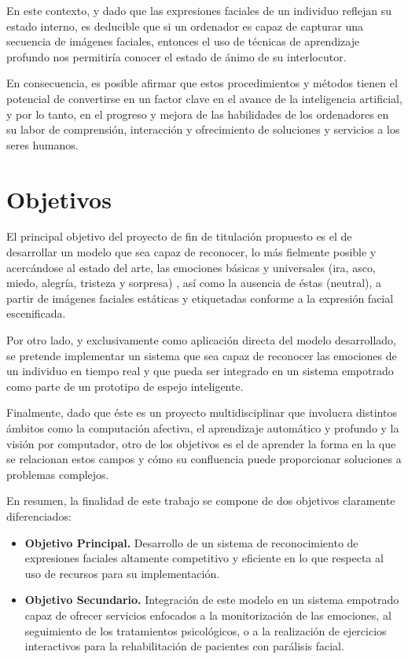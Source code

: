 En este contexto, y dado que las expresiones faciales de un individuo reflejan su estado interno, es deducible que si un ordenador es capaz de capturar una secuencia de imágenes faciales, entonces el uso de técnicas de aprendizaje profundo nos permitiría conocer el estado de ánimo de su interlocutor. 

En consecuencia, es posible afirmar que estos procedimientos y métodos tienen el potencial de convertirse en un factor clave en el avance de la inteligencia artificial, y por lo tanto, en el progreso y mejora de las habilidades de los ordenadores en su labor de comprensión, interacción y ofrecimiento de soluciones y servicios a los seres humanos.

\section{Objetivos}

El principal objetivo del proyecto de fin de titulación propuesto es el de desarrollar un modelo que sea capaz de reconocer, lo más fielmente posible y acercándose al estado del arte, las emociones básicas y universales (ira, asco, miedo, alegría, tristeza y sorpresa)  \cite{Ekman}, así como la ausencia de éstas (neutral), a partir de imágenes faciales estáticas y etiquetadas conforme a la expresión facial escenificada.

Por otro lado, y exclusivamente como aplicación directa del modelo desarrollado, se pretende implementar un sistema que sea capaz de reconocer las emociones de un individuo en tiempo real y que pueda ser integrado en un sistema empotrado como parte de un prototipo de espejo inteligente.

Finalmente, dado que éste es un proyecto multidisciplinar que involucra distintos ámbitos como la computación afectiva, el aprendizaje automático y profundo y la visión por computador, otro de los objetivos es el de aprender la forma en la que se relacionan estos campos y cómo su confluencia puede proporcionar soluciones a problemas complejos.

En resumen, la finalidad de este trabajo se compone de dos objetivos claramente diferenciados:
\begin{itemize}
  \item \textbf{Objetivo Principal.} Desarrollo de un sistema de reconocimiento de expresiones faciales altamente competitivo y eficiente en lo que respecta al uso de recursos para su implementación.
  \item \textbf{Objetivo Secundario.} Integración de este modelo en un sistema empotrado capaz de ofrecer servicios enfocados a la monitorización de las emociones, al seguimiento de los tratamientos psicológicos, o a la realización de ejercicios interactivos para la rehabilitación de pacientes con parálisis facial.

\end{itemize}

